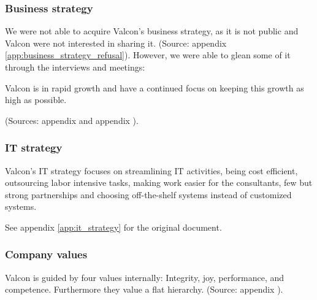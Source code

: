 \subsubsection{Business strategy}
We were not able to acquire Valcon's business strategy, as it is not public and Valcon were not interested in sharing it. (Source: appendix \ref{app:business_strategy_refusal}). 
However, we were able to glean some of it through the interviews and meetings:

Valcon is in rapid growth and have a continued focus on keeping this growth as high as possible. 

(Sources: appendix  and appendix ).

\subsubsection{IT strategy}
Valcon's IT strategy focuses on streamlining IT activities, being cost efficient, outsourcing labor intensive tasks, making work easier for the consultants, few but strong partnerships and choosing off-the-shelf systems instead of customized systems.

See appendix \ref{app:it_strategy} for the original document.

\subsubsection{Company values}
Valcon is guided by four values internally: Integrity, joy, performance, and competence.
Furthermore they value a flat hierarchy.
(Source: appendix ).